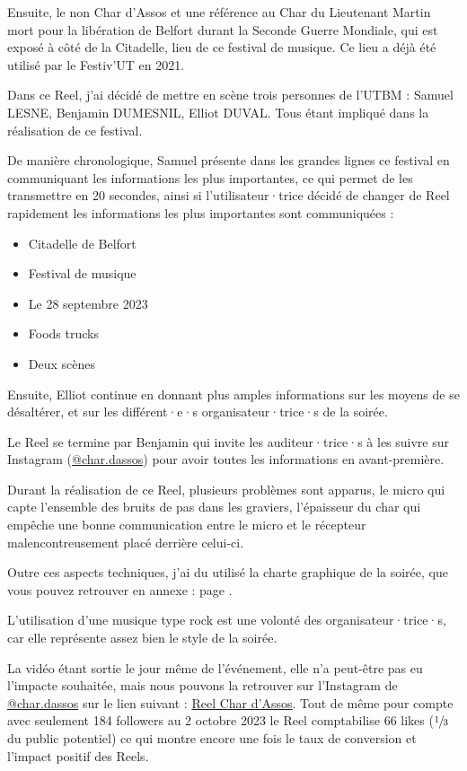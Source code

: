 Ensuite, le non Char d'Assos et une référence au Char du Lieutenant Martin mort pour la libération de Belfort durant la Seconde Guerre Mondiale, qui est exposé à côté de la Citadelle, lieu de ce festival de musique.
Ce lieu a déjà été utilisé par le Festiv'UT en 2021.

Dans ce Reel, j'ai décidé de mettre en scène trois personnes de l'\gls{UTBM} : Samuel LESNE, Benjamin DUMESNIL, Elliot DUVAL.
Tous étant impliqué dans la réalisation de ce festival.

De manière chronologique, Samuel présente dans les grandes lignes ce festival en communiquant les informations les plus importantes, ce qui permet de les transmettre en 20 secondes, ainsi si l'utilisateur·trice décidé de changer de Reel rapidement les informations les plus importantes sont communiquées :
\begin{itemize}
    \item Citadelle de Belfort
    \item Festival de musique
    \item Le 28 septembre 2023
    \item Foods trucks
    \item Deux scènes
\end{itemize}

Ensuite, Elliot continue en donnant plus amples informations sur les moyens de se désaltérer, et sur les différent·e·s organisateur·trice·s de la soirée.

Le Reel se termine par Benjamin qui invite les auditeur·trice·s à les suivre sur Instagram (\href{https://www.instagram.com/char.dassos/}{@char.dassos}) pour avoir toutes les informations en avant-première.

Durant la réalisation de ce Reel, plusieurs problèmes sont apparus, le micro qui capte l'ensemble des bruits de pas dans les graviers, l'épaisseur du char qui empêche une bonne communication entre le micro et le récepteur malencontreusement placé derrière celui-ci.

Outre ces aspects techniques, j'ai du utilisé la charte graphique de la soirée, que vous pouvez retrouver en annexe : page \pageref{subsec:charte-char-dassos}.

L'utilisation d'une musique type rock est une volonté des organisateur·trice·s, car elle représente assez bien le style de la soirée.

La vidéo étant sortie le jour même de l'événement, elle n'a peut-être pas eu l'impacte souhaitée, mais nous pouvons la retrouver sur l'Instagram de \href{https://www.instagram.com/char.dassos/}{@char.dassos} sur le lien suivant : \href{https://www.instagram.com/reel/Cxuj5g2MKov/?utm_source=ig_web_button_share_sheet&igshid=MzRlODBiNWFlZA==}{Reel Char d'Assos}.
Tout de même pour compte avec seulement 184 followers au 2 octobre 2023 le Reel comptabilise 66 likes ($\sfrac{1}{3}$ du public potentiel) ce qui montre encore une fois le taux de conversion et l'impact positif des Reels.

